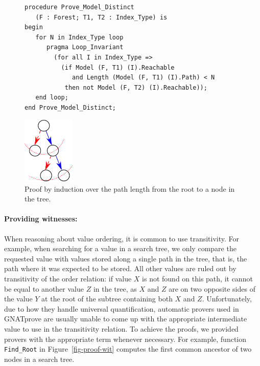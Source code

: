 \documentclass{llncs}
\newcommand{\gnatprove}{GNATprove\xspace}
\begin{document}
\begin{figure}
\vspace{-0.5cm}
\begin{minipage}[c]{.75\linewidth}
\begin{small}
\begin{lstlisting}
procedure Prove_Model_Distinct
   (F : Forest; T1, T2 : Index_Type) is
begin
   for N in Index_Type loop
      pragma Loop_Invariant
        (for all I in Index_Type =>
          (if Model (F, T1) (I).Reachable
             and Length (Model (F, T1) (I).Path) < N
           then not Model (F, T2) (I).Reachable));
   end loop;
end Prove_Model_Distinct;
\end{lstlisting}
\end{small}
\end{minipage}\hfill
\begin{minipage}[c]{.22\linewidth}
\begin{center}
\includegraphics[width=25mm]{induction.pdf}
\end{center}
\end{minipage}
\caption{\label{fig-proof-ind} Proof by induction over the path length from the root to a node in the tree.}
\vspace{-0.5cm}
\end{figure}

\paragraph{Providing witnesses:}
When reasoning about value ordering, it is common to use transitivity. For example, when searching for
a value in a search tree, we only compare the requested value with values stored along a single path in
the tree, that is, the path where it was expected to be stored.
All other values are ruled out by transitivity of the order relation:
if value $X$ is not found on this path, it cannot be equal to another value $Z$ in the tree,
as $X$ and $Z$ are on two opposite sides of the value $Y$ at the root of the subtree
containing both $X$ and $Z$.
Unfortunately, due to how they handle universal quantification,
automatic provers used in \gnatprove are usually unable to come up with the appropriate
intermediate value to use in the transitivity relation. To achieve the proofs, we provided
provers with the appropriate term whenever necessary. For example, function \texttt{Find\_Root} in
Figure~\ref{fig-proof-wit} computes the first common ancestor of two nodes in a search tree.
\end{document}

